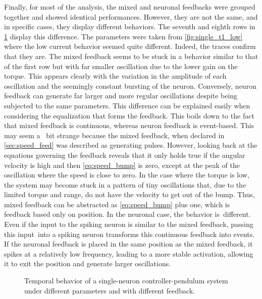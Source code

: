 Finally, for most of the analysis, the mixed and neuronal feedbacks were grouped together and showed identical performances.
However, they are not the same, and in specific cases, they display different behaviors.
The seventh and eighth rows in \cref{fig:single_control_traces} display this difference.
The parameters were taken from \cref{fig:single_t1_low} where the low current behavior seemed quite different.
Indeed, the traces confirm that they are.
The mixed feedback seems to be stuck in a behavior similar to that of the first row but with far smaller oscillation due to the lower gain on the torque.
This appears clearly with the variation in the amplitude of each oscillation and the seemingly constant bursting of the neuron.
Conversely, neuron feedback can generate far larger and more regular oscillations despite being subjected to the same parameters.
This difference can be explained easily when considering the equalization that forms the feedback.
This boils down to the fact that mixed feedback is continuous, whereas neuron feedback is event-based.
This may seem a  bit strange because the mixed feedback, when declared in \cref{sec:speed_feed} was described as generating pulses.
However, looking back at the equations governing the feedback reveals that it only holds true if the angular velocity is high and then \cref{eq:speed_bump} is zero, except at the peak of the oscillation where the speed is close to zero.
In the case where the torque is low, the system may become stuck in a pattern of tiny oscillations that, due to the limited torque and range, do not have the velocity to get out of the bump.
Thus, mixed feedback can be abstracted as \cref{eq:speed_bump} plus one, which is feedback based only on position.\label{par:mixed_problem}
In the neuronal case, the behavior is different.
Even if the input to the spiking neuron is similar to the mixed feedback, passing this input into a spiking neuron transforms this continuous feedback into events.
If the neuronal feedback is placed in the same position as the mixed feedback, it spikes at a relatively low frequency, leading to a more stable activation, allowing it to exit the position and generate larger oscillations.

\begin{figure}[!htbp]
    \centering
    \caption{Temporal behavior of a single-neuron controller-pendulum system under different parameters and with different feedback.}
    \label{fig:single_control_traces}
\end{figure}

